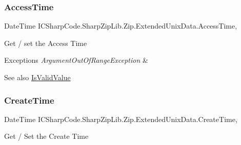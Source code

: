 \subsubsection{\texorpdfstring{Access\+Time}{AccessTime}}
{\footnotesize\ttfamily Date\+Time I\+C\+Sharp\+Code.\+Sharp\+Zip\+Lib.\+Zip.\+Extended\+Unix\+Data.\+Access\+Time\hspace{0.3cm}{\ttfamily [get]}, {\ttfamily [set]}}



Get / set the Access Time 


\begin{DoxyExceptions}{Exceptions}
{\em Argument\+Out\+Of\+Range\+Exception} & \\
\hline
\end{DoxyExceptions}
\begin{DoxySeeAlso}{See also}
\hyperlink{class_i_c_sharp_code_1_1_sharp_zip_lib_1_1_zip_1_1_extended_unix_data_a2643cdcd65d1e051056701e0255596ca}{Is\+Valid\+Value}


\end{DoxySeeAlso}
\mbox{\label{class_i_c_sharp_code_1_1_sharp_zip_lib_1_1_zip_1_1_extended_unix_data_a8cc2d8c696669b4f17e1718c016c980a}} 
\subsubsection{\texorpdfstring{Create\+Time}{CreateTime}}
{\footnotesize\ttfamily Date\+Time I\+C\+Sharp\+Code.\+Sharp\+Zip\+Lib.\+Zip.\+Extended\+Unix\+Data.\+Create\+Time\hspace{0.3cm}{\ttfamily [get]}, {\ttfamily [set]}}



Get / Set the Create Time 


